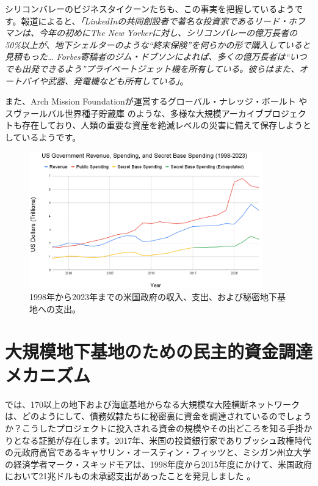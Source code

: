 \documentclass[10pt,twocolumn,letterpaper]{article}
\begin{document}
シリコンバレーのビジネスタイクーンたちも、この事実を把握しているようです。報道によると、\textit{「LinkedInの共同創設者で著名な投資家であるリード・ホフマンは、今年の初めにThe New Yorkerに対し、シリコンバレーの億万長者の50\%以上が、地下シェルターのような“終末保険”を何らかの形で購入していると見積もった… Forbes寄稿者のジム・ドブソンによれば、多くの億万長者は“いつでも出発できるよう”プライベートジェット機を所有している。彼らはまた、オートバイや武器、発電機なども所有している」}\cite{28}。

また、Arch Mission Foundationが運営するグローバル・ナレッジ・ボールト\cite{29} やスヴァールバル世界種子貯蔵庫\cite{30} のような、多様な大規模アーカイブプロジェクトも存在しており、人類の重要な資産を絶滅レベルの災害に備えて保存しようとしているようです。

\begin{figure}[t]
\begin{center}
\includegraphics[width=0.9\textwidth]{govcrop2.png}
\end{center}
   \caption{1998年から2023年までの米国政府の収入、支出、および秘密地下基地への支出\cite{19}。}
   \label{fig:9}
\end{figure}
\section{大規模地下基地のための民主的資金調達メカニズム}

では、170以上の地下および海底基地からなる大規模な大陸横断ネットワークは、どのようにして、債務奴隷たちに秘密裏に資金を調達されているのでしょうか？こうしたプロジェクトに投入される資金の規模やその出どころを知る手掛かりとなる証拠が存在します。2017年、米国の投資銀行家でありブッシュ政権時代の元政府高官であるキャサリン・オースティン・フィッツと、ミシガン州立大学の経済学者マーク・スキッドモアは、1998年度から2015年度にかけて、米国政府において21兆ドルもの未承認支出があったことを発見しました \cite{11,12,13}。
\end{document}
